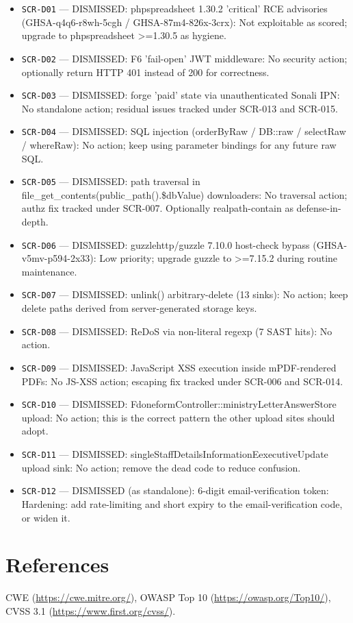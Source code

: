 \documentclass[11pt,a4paper]{article}
\begin{document}
\begin{itemize}[leftmargin=1.4em]
\item \texttt{SCR-D01} — DISMISSED: phpspreadsheet 1.30.2 'critical' RCE advisories (GHSA-q4q6-r8wh-5cgh / GHSA-87m4-826x-3crx): Not exploitable as scored; upgrade to phpspreadsheet \textgreater{}=1.30.5 as hygiene.
\item \texttt{SCR-D02} — DISMISSED: F6 'fail-open' JWT middleware: No security action; optionally return HTTP 401 instead of 200 for correctness.
\item \texttt{SCR-D03} — DISMISSED: forge 'paid' state via unauthenticated Sonali IPN: No standalone action; residual issues tracked under SCR-013 and SCR-015.
\item \texttt{SCR-D04} — DISMISSED: SQL injection (orderByRaw / DB::raw / selectRaw / whereRaw): No action; keep using parameter bindings for any future raw SQL.
\item \texttt{SCR-D05} — DISMISSED: path traversal in file\_get\_contents(public\_path().\$dbValue) downloaders: No traversal action; authz fix tracked under SCR-007. Optionally realpath-contain as defense-in-depth.
\item \texttt{SCR-D06} — DISMISSED: guzzlehttp/guzzle 7.10.0 host-check bypass (GHSA-v5mv-p594-2x33): Low priority; upgrade guzzle to \textgreater{}=7.15.2 during routine maintenance.
\item \texttt{SCR-D07} — DISMISSED: unlink() arbitrary-delete (13 sinks): No action; keep delete paths derived from server-generated storage keys.
\item \texttt{SCR-D08} — DISMISSED: ReDoS via non-literal regexp (7 SAST hits): No action.
\item \texttt{SCR-D09} — DISMISSED: JavaScript XSS execution inside mPDF-rendered PDFs: No JS-XSS action; escaping fix tracked under SCR-006 and SCR-014.
\item \texttt{SCR-D10} — DISMISSED: FdoneformController::ministryLetterAnswerStore upload: No action; this is the correct pattern the other upload sites should adopt.
\item \texttt{SCR-D11} — DISMISSED: singleStaffDetailsInformationEexecutiveUpdate upload sink: No action; remove the dead code to reduce confusion.
\item \texttt{SCR-D12} — DISMISSED (as standalone): 6-digit email-verification token: Hardening: add rate-limiting and short expiry to the email-verification code, or widen it.
\end{itemize}
\section*{References}
CWE (\url{https://cwe.mitre.org/}), OWASP Top 10 (\url{https://owasp.org/Top10/}), CVSS 3.1 (\url{https://www.first.org/cvss/}).
\end{document}

